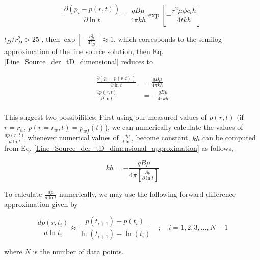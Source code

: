 \documentclass{llncs}
\numberwithin{equation}{section}
\numberwithin{figure}{section}
\numberwithin{table}{section}
\begin{document}
    \begin{equation}
    \frac{\partial \left( {{p}_{i}}-p\left( r,t \right) \right)}{\partial \ln t}=\frac{qB\mu }{4\pi kh}\exp \left[ -\frac{{{r}^{2}}\mu \phi {{c}_{t}}h}{4tkh} \right]
        \label{Line_Source_der_tD_dimensional}
    \end{equation}

     $t_{D}/r_{D}^{2}>25$ , then $\exp \left[ -\frac{r_{D}^{2}}{4{{t}_{D}}} \right]\approx 1$, which corresponds to the semilog approximation of the line source solution, then Eq. \ref{Line_Source_der_tD_dimensional} reduces to

    \begin{equation}
        \begin{split}
      \frac{\partial \left( {{p}_{i}}-p\left( r,t \right) \right)}{\partial \ln t}&=\frac{qB\mu }{4\pi kh} \\
     \frac{\partial p\left( r,t \right)}{\partial \ln t}&=-\frac{qB\mu }{4\pi kh} \\
    \end{split}
        \label{Line_Source_der_tD_dimensional_approximation}
    \end{equation}

    This suggest two possibilities: First using our measured values of $p(r,t)$ (if $r=r_{w}$, $p(r=r_{w},t)=p_{wf}(t)$), we can numerically calculate the values of $\frac{dp\left( r,t \right)}{d\ln t}$ whenever numerical values of $\frac{dp}{d\ln t}$ become constant, $kh$ can be computed from Eq. \ref{Line_Source_der_tD_dimensional_approximation} as follows,

    \begin{equation}
        kh=-\frac{qB\mu }{4\pi \left[ \frac{\partial p}{\partial \ln t} \right]}
        \label{Line_Source_der_tD_dimensional_approximation_kh}
    \end{equation}

    To calculate $\frac{dp}{d\ln t}$ numerically, we may use the following forward difference approximation given by

    \begin{equation}
        \frac{dp\left( r,{{t}_{i}} \right)}{d\ln {{t}_{i}}}\approx \frac{p\left( {{t}_{i+1}} \right)-p\left( {{t}_{i}} \right)}{\ln \left( {{t}_{i+1}} \right)-\ln \left( {{t}_{i}} \right)}\quad ;\quad i=1,2,3,\ldots ,N-1
        \label{numerical_dp_dplnt_forward_difference}
    \end{equation}

    where $N$ is the number of data points.
\end{document}

